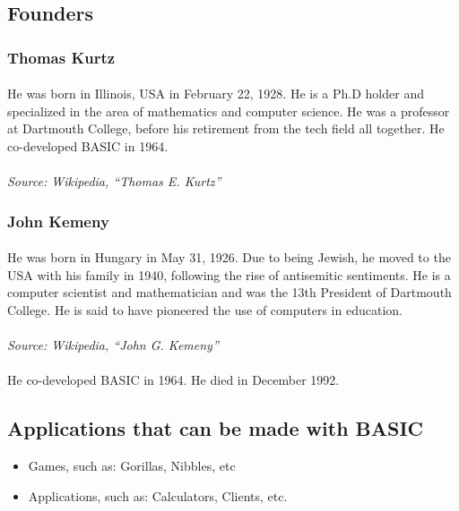 \documentclass{article}
\begin{document}
	\subsection{Founders}
	\subsubsection*{Thomas Kurtz}
	\paragraph{}He was born in Illinois, USA in February 22, 1928.
	He is a Ph.D holder and specialized in the area of mathematics and computer science.
	He was a professor at Dartmouth College, before his retirement from the tech field all together.
	He co-developed BASIC in 1964.
	\paragraph{}\textit{Source: Wikipedia, “Thomas E. Kurtz”}
	\subsubsection*{John Kemeny}
	\paragraph{}He was born in Hungary in May 31, 1926.
	Due to being Jewish, he moved to the USA with his family in 1940, following the rise of antisemitic sentiments.
	He is a computer scientist and mathematician and was the 13th President of Dartmouth College.
	He is said to have pioneered the use of computers in education.
	\paragraph{}\textit{Source: Wikipedia, “John G. Kemeny”}
	\paragraph{}He co-developed BASIC in 1964.
	He died in December 1992.
	\subsection{Applications that can be made with BASIC}
	\begin{itemize}
		\item Games, such as: Gorillas, Nibbles, etc
		\item Applications, such as: Calculators, Clients, etc.
	\end{itemize}
\end{document}
